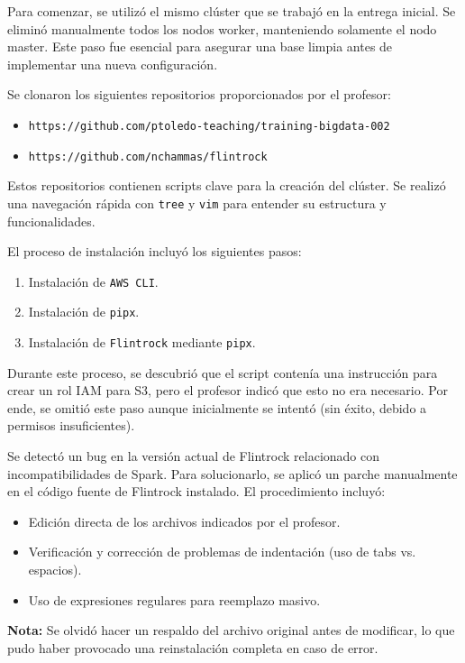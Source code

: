 \documentclass[12pt,letterpaper,twoside]{article}
\begin{document}
Para comenzar, se utilizó el mismo clúster que se trabajó en la entrega inicial. Se eliminó manualmente todos los nodos worker, manteniendo solamente el nodo master. Este paso fue esencial para asegurar una base limpia antes de implementar una nueva configuración.

Se clonaron los siguientes repositorios proporcionados por el profesor:
\begin{itemize}
    \item \texttt{https://github.com/ptoledo-teaching/training-bigdata-002}
    \item \texttt{https://github.com/nchammas/flintrock}
\end{itemize}

Estos repositorios contienen scripts clave para la creación del clúster. Se realizó una navegación rápida con \texttt{tree} y \texttt{vim} para entender su estructura y funcionalidades.

El proceso de instalación incluyó los siguientes pasos:
\begin{enumerate}
    \item Instalación de \texttt{AWS CLI}.
    \item Instalación de \texttt{pipx}.
    \item Instalación de \texttt{Flintrock} mediante \texttt{pipx}.
\end{enumerate}

Durante este proceso, se descubrió que el script contenía una instrucción para crear un rol IAM para S3, pero el profesor indicó que esto no era necesario. Por ende, se omitió este paso aunque inicialmente se intentó (sin éxito, debido a permisos insuficientes).


Se detectó un bug en la versión actual de Flintrock relacionado con incompatibilidades de Spark. Para solucionarlo, se aplicó un parche manualmente en el código fuente de Flintrock instalado. El procedimiento incluyó:
\begin{itemize}
    \item Edición directa de los archivos indicados por el profesor.
    \item Verificación y corrección de problemas de indentación (uso de tabs vs. espacios).
    \item Uso de expresiones regulares para reemplazo masivo.
\end{itemize}

\textbf{Nota:} Se olvidó hacer un respaldo del archivo original antes de modificar, lo que pudo haber provocado una reinstalación completa en caso de error.
\end{document}
